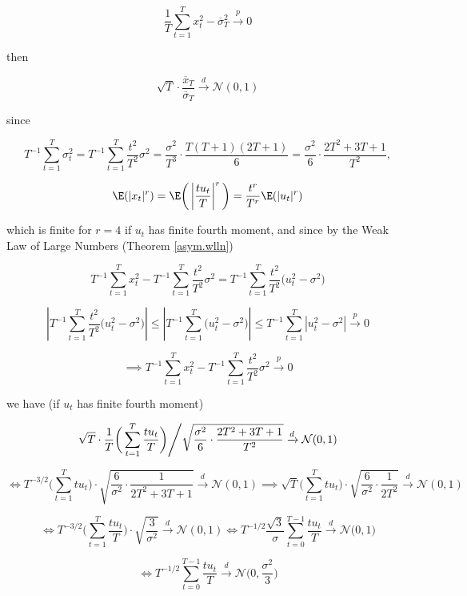 \begin{enumerate}[(a)]
{{\[
\frac{1}{T} \sum_{t=1}^T x_t^2 - \overline{\sigma}_T^2 \xrightarrow{p} 0
\]

then 

\[
\sqrt{T} \cdot \frac{\overline{x}_T }{ \overline{\sigma}_T} \xrightarrow{d} \mathcal{N}(0, 1)
\]
}
}

since

\[
T^{-1} \sum_{t=1}^T \sigma_t^2 = T^{-1} \sum_{t=1}^T  \frac{t^2}{T^2} \sigma^2 = \frac{\sigma^2}{T^3} \cdot \frac{T(T+1)(2T+1)}{6} = \frac{\sigma^2}{6} \cdot \frac{2T^2 + 3T + 1}{T^2},
\]

\[
\E(|x_t|^r) = \E\bigg( \left| \frac{ t u_{t}}{T} \right| ^r \bigg) = \frac{t^r}{T^r} \E(|u_t|^r) 
\]

which is finite for \(r=4\) if \(u_t\) has finite fourth moment, and since by the Weak Law of Large Numbers (Theorem \ref{asym.wlln})

\[
T^{-1}\sum_{t=1}^T x_t^2 -  T^{-1} \sum_{t=1}^T  \frac{t^2}{T^2} \sigma^2 = T^{-1} \sum_{t=1}^T \frac{t^2}{T^2} \big( u_t^2 - \sigma^2\big)  
\]

\[
\left| T^{-1} \sum_{t=1}^T \frac{t^2}{T^2} \big( u_t^2 - \sigma^2\big)   \right| \leq \left| T^{-1} \sum_{t=1}^T  \big( u_t^2 - \sigma^2\big) \right| \leq T^{-1} \sum_{t=1}^T   \left|  u_t^2 - \sigma^2 \right| \xrightarrow{p} 0
\]

\[
\implies T^{-1}\sum_{t=1}^T x_t^2 -  T^{-1} \sum_{t=1}^T  \frac{t^2}{T^2} \sigma^2 \xrightarrow{p} 0
\]

we have (if \(u_t\) has finite fourth moment)

\[
\left. \sqrt{T} \cdot \frac{1}{T} \bigg( \sum_{t=1}^T \frac{t u_t}{T} \bigg) \middle/\sqrt{  \frac{\sigma^2}{6} \cdot \frac{2T^2 + 3T + 1}{T^2} }  \xrightarrow{d} \mathcal{N}(0, 1) \right.
\]

\[
\iff  T^{-3/2} \bigg( \sum_{t=1}^T t u_t \bigg) \cdot \sqrt{ \frac{6}{\sigma^2} \cdot \frac{1}{2T^2 + 3T + 1}}  \xrightarrow{d} \mathcal{N}(0, 1) \implies  \sqrt{T}  \bigg( \sum_{t=1}^T t u_t \bigg) \cdot \sqrt{ \frac{6}{\sigma^2} \cdot \frac{1}{2T^2 } }  \xrightarrow{d} \mathcal{N}(0, 1)
\]


\[
\iff  T^{-3/2} \bigg( \sum_{t=1}^T \frac{t u_t}{T} \bigg) \cdot \sqrt{ \frac{3}{\sigma^2}  }   \xrightarrow{d} \mathcal{N}(0, 1) \iff T^{-1/2} \frac{\sqrt{3}}{\sigma} \sum_{t=0}^{T-1} \frac{ t u_{t}}{T}   \xrightarrow{d} \mathcal{N}\bigg(0, 1\bigg)
\]



\begin{equation}\label{ts.hw4.3b.dist}
\iff T^{-1/2} \sum_{t=0}^{T-1} \frac{ t u_{t}}{T}   \xrightarrow{d} \mathcal{N}\bigg(0, \frac{\sigma^2}{3} \bigg)
\end{equation}


\end{enumerate}
